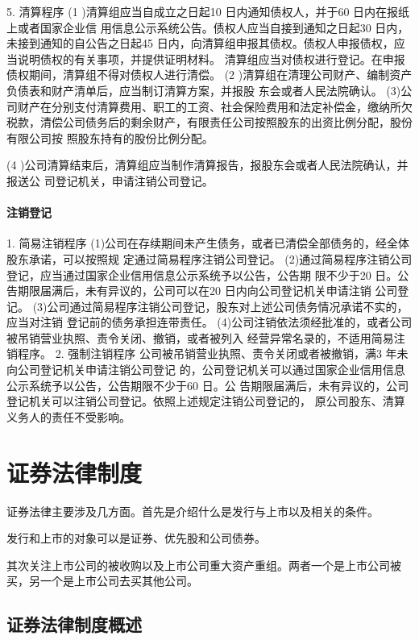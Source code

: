 \documentclass[UTF8,12pt]{ctexart}
\numberwithin{equation}{section} %
\numberwithin{figure}{section}
\numberwithin{table}{section}
\begin{document}
	5. 清算程序
	(1 )清算组应当自成立之日起10 日内通知债权人，并于60 日内在报纸上或者国家企业信 用信息公示系统公告。债权人应当自接到通知之日起30 日内，未接到通知的自公告之日起45 日内，向清算组申报其债权。债权人申报债权，应当说明债权的有关事项，并提供证明材料。 清算组应当对债权进行登记。在申报债权期间，清算组不得对债权人进行清偿。
	(2 )清算组在清理公司财产、编制资产负债表和财产清单后，应当制订清算方案，并报股 东会或者人民法院确认。 (3)公司财产在分别支付清算费用、职工的工资、社会保险费用和法定补偿金，缴纳所欠 税款，清偿公司债务后的剩余财产，有限责任公司按照股东的出资比例分配，股份有限公司按 照股东持有的股份比例分配。
	
	
	(4 )公司清算结束后，清算组应当制作清算报告，报股东会或者人民法院确认，并报送公 司登记机关，申请注销公司登记。
	
	\paragraph{注销登记}
	1. 简易注销程序 (1)公司在存续期间未产生债务，或者已清偿全部债务的，经全体股东承诺，可以按照规 定通过简易程序注销公司登记。 (2)通过简易程序注销公司登记，应当通过国家企业信用信息公示系统予以公告，公告期 限不少于20 日。公告期限届满后，未有异议的，公司可以在20 日内向公司登记机关申请注销 公司登记。 (3)公司通过简易程序注销公司登记，股东对上述公司债务情况承诺不实的，应当对注销 登记前的债务承担连带责任。 (4)公司注销依法须经批准的，或者公司被吊销营业执照、责令关闭、撤销，或者被列入 经营异常名录的，不适用简易注销程序。
	2. 强制注销程序
	公司被吊销营业执照、责令关闭或者被撤销，满3 年未向公司登记机关申请注销公司登记 的，公司登记机关可以通过国家企业信用信息公示系统予以公告，公告期限不少于60 日。公 告期限届满后，未有异议的，公司登记机关可以注销公司登记。依照上述规定注销公司登记的， 原公司股东、清算义务人的责任不受影响。
	
	\newpage
	\section{证券法律制度}
	证券法律主要涉及几方面。首先是介绍什么是发行与上市以及相关的条件。
	
	发行和上市的对象可以是证券、优先股和公司债券。
	
	其次关注上市公司的被收购以及上市公司重大资产重组。两者一个是上市公司被买，另一个是上市公司去买其他公司。
	
	
	
	\subsection{证券法律制度概述}
	
\end{document}
